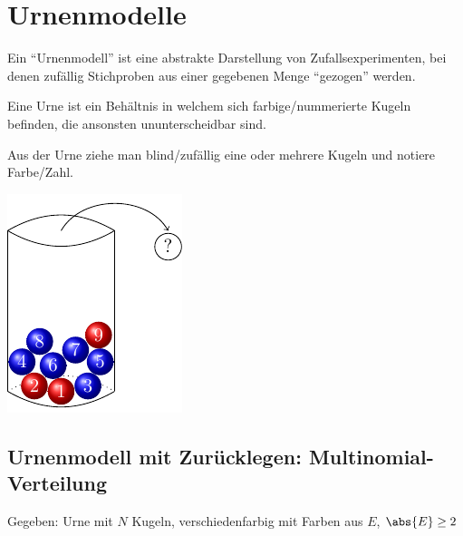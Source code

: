 \section{Urnenmodelle}

Ein ``Urnenmodell'' ist eine abstrakte Darstellung von Zufallsexperimenten, bei denen zufällig Stichproben aus einer gegebenen Menge ``gezogen'' werden.
\begin{*definition}[Urne]
	Eine Urne ist ein Behältnis in welchem sich farbige/nummerierte Kugeln befinden, die ansonsten ununterscheidbar sind.
\end{*definition}
Aus der Urne ziehe man blind/zufällig eine oder mehrere Kugeln und notiere Farbe/Zahl.

\begin{center}
%	
    \includegraphics{../../Material/urne_mit_kugeln.pdf}
\end{center}

\subsection{Urnenmodell mit Zurücklegen: Multinomial-Verteilung}

Gegeben: Urne mit $N$ Kugeln, verschiedenfarbig mit Farben aus $E$, $\abs{E} \ge 2$ 

